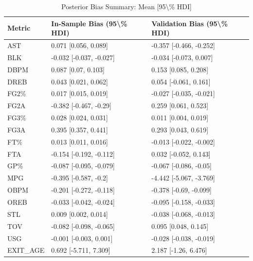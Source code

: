 \begin{table}[t]
\caption*{
{\large Posterior Bias Summary: Mean [95\textbackslash{}\% HDI]}
} 
\fontsize{12.0pt}{14.4pt}\selectfont
\begin{tabular*}{\linewidth}{@{\extracolsep{\fill}}lll}
\toprule
Metric & In-Sample Bias (95\textbackslash{}\% HDI) & Validation Bias (95\textbackslash{}\% HDI) \\ 
\midrule\addlinespace[2.5pt]
AST & 0.071 [0.056, 0.089] & -0.357 [-0.466, -0.252] \\ 
BLK & -0.032 [-0.037, -0.027] & -0.034 [-0.073, 0.007] \\ 
DBPM & 0.087 [0.07, 0.103] & 0.153 [0.085, 0.208] \\ 
DREB & 0.043 [0.021, 0.062] & 0.054 [-0.061, 0.161] \\ 
FG2\% & 0.017 [0.015, 0.019] & -0.027 [-0.035, -0.021] \\ 
FG2A & -0.382 [-0.467, -0.29] & 0.259 [0.061, 0.523] \\ 
FG3\% & 0.028 [0.024, 0.031] & 0.011 [0.004, 0.019] \\ 
FG3A & 0.395 [0.357, 0.441] & 0.293 [0.043, 0.619] \\ 
FT\% & 0.013 [0.011, 0.016] & -0.013 [-0.022, -0.002] \\ 
FTA & -0.154 [-0.192, -0.112] & 0.032 [-0.052, 0.143] \\ 
GP\% & -0.087 [-0.095, -0.079] & -0.067 [-0.086, -0.05] \\ 
MPG & -0.395 [-0.587, -0.2] & -4.442 [-5.067, -3.769] \\ 
OBPM & -0.201 [-0.272, -0.118] & -0.378 [-0.69, -0.099] \\ 
OREB & -0.033 [-0.042, -0.024] & -0.095 [-0.158, -0.033] \\ 
STL & 0.009 [0.002, 0.014] & -0.038 [-0.068, -0.013] \\ 
TOV & -0.082 [-0.098, -0.065] & 0.095 [0.048, 0.145] \\ 
USG & -0.001 [-0.003, 0.001] & -0.028 [-0.038, -0.019] \\ 
EXIT\_AGE & 0.692 [-5.711, 7.309] & 2.187 [-1.26, 6.476] \\ 
\bottomrule
\end{tabular*}
\end{table}

